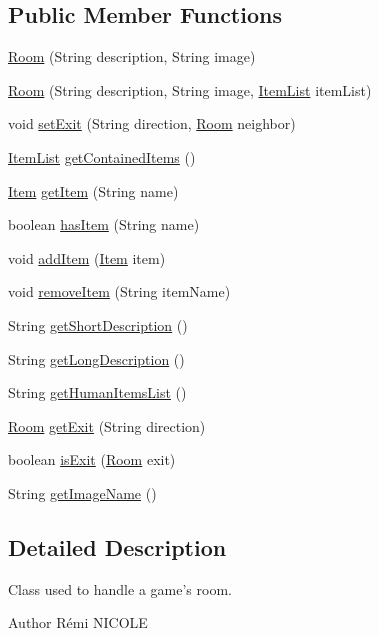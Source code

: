\subsection*{Public Member Functions}
\begin{DoxyCompactItemize}
\item 
\hyperlink{classRoom_a2cdcbb3d86746330a5a01c7fae4de02c}{Room} (String description, String image)
\item 
\hyperlink{classRoom_ad8cb507b670aec86cf14baa25fadb0f2}{Room} (String description, String image, \hyperlink{classItemList}{Item\-List} item\-List)
\item 
void \hyperlink{classRoom_ae4bc6837f331b5249beb0651fc277018}{set\-Exit} (String direction, \hyperlink{classRoom}{Room} neighbor)
\item 
\hyperlink{classItemList}{Item\-List} \hyperlink{classRoom_ab9ebd5a52d437f7724bf8474fffae81f}{get\-Contained\-Items} ()
\item 
\hyperlink{classItem}{Item} \hyperlink{classRoom_a9b53c8d9f87f4a6d9cc954aeb744d1a2}{get\-Item} (String name)
\item 
boolean \hyperlink{classRoom_ad779b367b26018c9f343ca3044c4b54f}{has\-Item} (String name)
\item 
void \hyperlink{classRoom_a0b4fcc1c1c04e60efa7ae5f82ea37157}{add\-Item} (\hyperlink{classItem}{Item} item)
\item 
void \hyperlink{classRoom_a591912d92553130f8f90a5bebd236a5c}{remove\-Item} (String item\-Name)
\item 
String \hyperlink{classRoom_a85e561bc5fa9d9c965300e9ad264b02a}{get\-Short\-Description} ()
\item 
String \hyperlink{classRoom_a23a25854d7544fb0b41190a4d6bd1322}{get\-Long\-Description} ()
\item 
String \hyperlink{classRoom_ab8a87ad306f77a936873094b479bcde8}{get\-Human\-Items\-List} ()
\item 
\hyperlink{classRoom}{Room} \hyperlink{classRoom_a384ab8c844e5775f87de24d6c470637e}{get\-Exit} (String direction)
\item 
boolean \hyperlink{classRoom_a844b42638a0d2ce68df9adf1674f713b}{is\-Exit} (\hyperlink{classRoom}{Room} exit)
\item 
String \hyperlink{classRoom_a8177668df4d8be718812934673c42649}{get\-Image\-Name} ()
\end{DoxyCompactItemize}


\subsection{Detailed Description}
Class used to handle a game's room. \begin{DoxyAuthor}{Author}
Rémi N\-I\-C\-O\-L\-E 
\end{DoxyAuthor}


